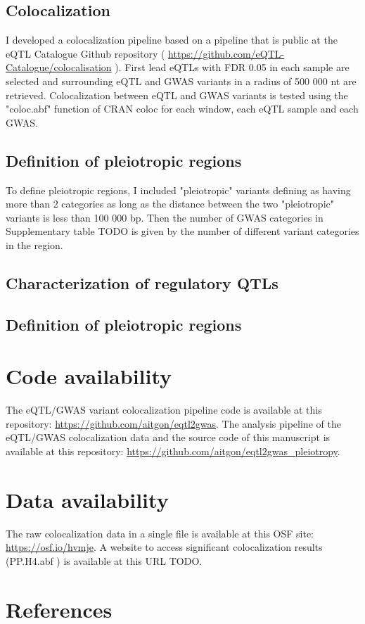 \subsection*{Colocalization}

I developed a colocalization pipeline based on a pipeline that is public at the eQTL Catalogue Github repository ( \url{https://github.com/eQTL-Catalogue/colocalisation} ).
%
First lead eQTLs with FDR 0.05 in each sample are selected and surrounding eQTL and GWAS variants in a radius of 500 000 nt are retrieved.
%
Colocalization between eQTL and GWAS variants is tested using the "coloc.abf" function of CRAN coloc for each window, each eQTL sample and each GWAS.

\subsection*{Definition of pleiotropic regions}

To define pleiotropic regions, I included "pleiotropic" variants defining as having more than 2 categories as long as the distance between the two "pleiotropic" variants is less than 100 000 bp.
%
Then the number of GWAS categories in Supplementary table TODO is given by the number of different variant categories in the region.

\subsection*{Characterization of regulatory QTLs}


\subsection*{Definition of pleiotropic regions}

\section*{Code availability}

The eQTL/GWAS variant colocalization pipeline code is available at this repository: \url{https://github.com/aitgon/eqtl2gwas}.
%
The analysis pipeline of the eQTL/GWAS colocalization data and the source code of this manuscript is available at this repository: \url{https://github.com/aitgon/eqtl2gwas_pleiotropy}.

\section*{Data availability}

The raw colocalization data in a single file is available at this OSF site: \url{https://osf.io/hvmje}.
%
A website to access significant colocalization results (PP.H4.abf ) is available at this URL TODO.

\section*{References}




